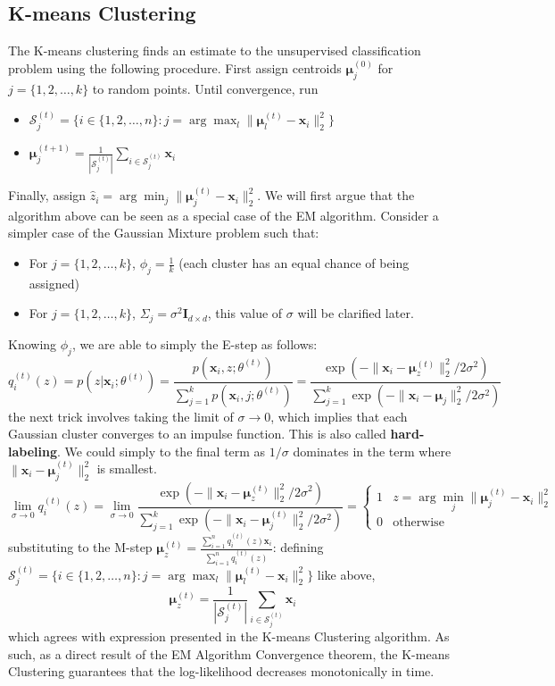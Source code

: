 \subsection{K-means Clustering}
The K-means clustering finds an estimate to the unsupervised classification problem using the following procedure. First assign centroids $\boldsymbol{\mu}_j^{(0)}$ for $j=\{1,2,\dots,k\}$ to random points. Until convergence, run
\begin{itemize}
    \item $\mathcal{S}_j^{(t)} = \{i\in\{1,2,\dots,n\}:j=\arg\max_l\|\boldsymbol{\mu}_l^{(t)}-\mathbf{x}_i\|_2^2\}$
    \item $\boldsymbol{\mu}_j^{(t+1)}=\frac{1}{|\mathcal{S}_j^{(t)}|}\sum_{i\in \mathcal{S}_j^{(t)}} \mathbf{x}_i$
\end{itemize}
Finally, assign $\hat{z}_i=\arg\min_j\|\boldsymbol{\mu}_j^{(t)}-\mathbf{x}_i\|_2^2$. We will first argue that the algorithm above can be seen as a special case of the EM algorithm. Consider a simpler case of the Gaussian Mixture problem such that:
\begin{itemize}
    \item For $j=\{1,2,\dots,k\}$, $\phi_j=\frac{1}{k}$ (each cluster has an equal chance of being assigned)
    \item For $j=\{1,2,\dots,k\}$, $\Sigma_j=\sigma^2\mathbf{I}_{d\times d}$, this value of $\sigma$ will be clarified later.
\end{itemize}
Knowing $\phi_j$, we are able to simply the E-step as follows:
\[
    q_i^{(t)}(z) = p(z|\mathbf{x}_i;\theta^{(t)}) = \frac{p(\mathbf{x}_i,z;\theta^{(t)})}{\sum_{j=1}^k p(\mathbf{x}_i,j;\theta^{(t)})} = \frac{\exp(-\|\mathbf{x}_i-\boldsymbol{\mu}^{(t)}_z\|_2^2/2\sigma^2)}{\sum_{j=1}^k \exp(-\|\mathbf{x}_i-\boldsymbol{\mu}_j\|_2^2/2\sigma^2)}
\]
the next trick involves taking the limit of $\sigma\to0$, which implies that each Gaussian cluster converges to an impulse function. This is also called \textbf{hard-labeling}. We could simply to the final term as $1/\sigma$ dominates in the term where $\|\mathbf{x}_i-\boldsymbol{\mu}^{(t)}_j\|_2^2$ is smallest.
\[
\lim_{\sigma\rightarrow0} q_i^{(t)}(z) = \lim_{\sigma\rightarrow0} \frac{\exp(-\|\mathbf{x}_i-\boldsymbol{\mu}^{(t)}_z\|_2^2/2\sigma^2)}{\sum_{j=1}^k \exp(-\|\mathbf{x}_i-\boldsymbol{\mu}^{(t)}_j\|_2^2/2\sigma^2)} = \begin{cases}
    1 & z = \arg\min_j\|\boldsymbol{\mu}_j^{(t)}-\mathbf{x}_i\|_2^2 \\
    0 & \text{otherwise}
\end{cases}
\]
substituting to the M-step $\boldsymbol{\mu}_z^{(t)} = \frac{\sum_{i=1}^n q_i^{(t)}(z) \mathbf{x}_i}{\sum_{i=1}^n q_i^{(t)}(z)}$: defining $\mathcal{S}_j^{(t)} = \{i\in\{1,2,\dots,n\}:j=\arg\max_l\|\boldsymbol{\mu}_l^{(t)}-\mathbf{x}_i\|_2^2\}$ like above,
\[
    \boldsymbol{\mu}_z^{(t)} = \frac{1}{|\mathcal{S}_j^{(t)}|}\sum_{i\in \mathcal{S}_j^{(t)}} \mathbf{x}_i
\]
which agrees with expression presented in the K-means Clustering algorithm. As such, as a direct result of the EM Algorithm Convergence theorem, the K-means Clustering guarantees that the log-likelihood decreases monotonically in time.

